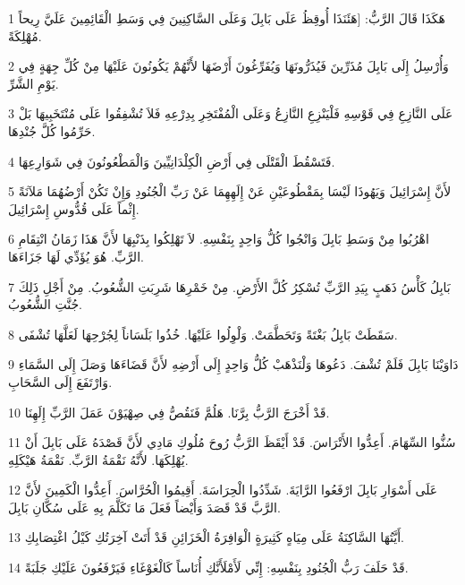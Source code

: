 \par 1 هَكَذَا قَالَ الرَّبُّ: [هَئَنَذَا أُوقِظُ عَلَى بَابِلَ وَعَلَى السَّاكِنِينَ فِي وَسَطِ الْقَائِمِينَ عَلَيَّ رِيحاً مُهْلِكَةً.
\par 2 وَأُرْسِلُ إِلَى بَابِلَ مُذَرِّينَ فَيُذَرُّونَهَا وَيُفَرِّغُونَ أَرْضَهَا لأَنَّهُمْ يَكُونُونَ عَلَيْهَا مِنْ كُلِّ جِهَةٍ فِي يَوْمِ الشَّرِّ.
\par 3 عَلَى النَّازِعِ فِي قَوْسِهِ فَلْيَنْزِعِ النَّازِعُ وَعَلَى الْمُفْتَخِرِ بِدِرْعِهِ فَلاَ تُشْفِقُوا عَلَى مُنْتَخَبِيهَا بَلْ حَرِّمُوا كُلَّ جُنْدِهَا.
\par 4 فَتَسْقُطَ الْقَتْلَى فِي أَرْضِ الْكِلْدَانِيِّينَ وَالْمَطْعُونُونَ فِي شَوَارِعِهَا.
\par 5 لأَنَّ إِسْرَائِيلَ وَيَهُوذَا لَيْسَا بِمَقْطُوعَيْنِ عَنْ إِلَهِهِمَا عَنْ رَبِّ الْجُنُودِ وَإِنْ تَكُنْ أَرْضُهُمَا مَلآنَةً إِثْماً عَلَى قُدُّوسِ إِسْرَائِيلَ.
\par 6 اهْرُبُوا مِنْ وَسَطِ بَابِلَ وَانْجُوا كُلُّ وَاحِدٍ بِنَفْسِهِ. لاَ تَهْلِكُوا بِذَنْبِهَا لأَنَّ هَذَا زَمَانُ انْتِقَامِ الرَّبِّ. هُوَ يُؤَدِّي لَهَا جَزَاءَهَا.
\par 7 بَابِلُ كَأْسُ ذَهَبٍ بِيَدِ الرَّبِّ تُسْكِرُ كُلَّ الأَرْضِ. مِنْ خَمْرِهَا شَرِبَتِ الشُّعُوبُ. مِنْ أَجْلِ ذَلِكَ جُنَّتِ الشُّعُوبُ.
\par 8 سَقَطَتْ بَابِلُ بَغْتَةً وَتَحَطَّمَتْ. وَلْوِلُوا عَلَيْهَا. خُذُوا بَلَسَاناً لِجُرْحِهَا لَعَلَّهَا تُشْفَى.
\par 9 دَاوَيْنَا بَابِلَ فَلَمْ تُشْفَ. دَعُوهَا وَلْنَذْهَبْ كُلُّ وَاحِدٍ إِلَى أَرْضِهِ لأَنَّ قَضَاءَهَا وَصَلَ إِلَى السَّمَاءِ وَارْتَفَعَ إِلَى السَّحَابِ.
\par 10 قَدْ أَخْرَجَ الرَّبُّ بِرَّنَا. هَلُمَّ فَنَقُصُّ فِي صِهْيَوْنَ عَمَلَ الرَّبِّ إِلَهِنَا.
\par 11 سُنُّوا السِّهَامَ. أَعِدُّوا الأَتْرَاسَ. قَدْ أَيْقَظَ الرَّبُّ رُوحَ مُلُوكِ مَادِي لأَنَّ قَصْدَهُ عَلَى بَابِلَ أَنْ يُهْلِكَهَا. لأَنَّهُ نَقْمَةُ الرَّبِّ. نَقْمَةُ هَيْكَلِهِ.
\par 12 عَلَى أَسْوَارِ بَابِلَ ارْفَعُوا الرَّايَةَ. شَدِّدُوا الْحِرَاسَةَ. أَقِيمُوا الْحُرَّاسَ. أَعِدُّوا الْكَمِينَ لأَنَّ الرَّبَّ قَدْ قَصَدَ وَأَيْضاً فَعَلَ مَا تَكَلَّمَ بِهِ عَلَى سُكَّانِ بَابِلَ.
\par 13 أَيَّتُهَا السَّاكِنَةُ عَلَى مِيَاهٍ كَثِيرَةٍ الْوَافِرَةُ الْخَزَائِنِ قَدْ أَتَتْ آخِرَتُكِ كَيْلُ اغْتِصَابِكِ.
\par 14 قَدْ حَلَفَ رَبُّ الْجُنُودِ بِنَفْسِهِ: إِنِّي لَأَمْلَأَنَّكِ أُنَاساً كَالْغَوْغَاءِ فَيَرْفَعُونَ عَلَيْكِ جَلَبَةً.
